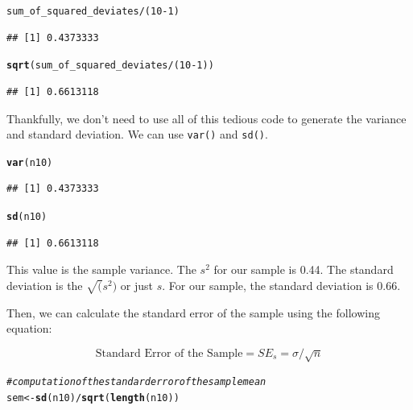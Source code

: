 \documentclass{tufte-handout}\usepackage[]{graphicx}\usepackage[]{color}
\makeatletter
\newcommand{\hlnum}[1]{\textcolor[rgb]{0.686,0.059,0.569}{#1}}%
\newcommand{\hlcom}[1]{\textcolor[rgb]{0.678,0.584,0.686}{\textit{#1}}}%
\newcommand{\hlopt}[1]{\textcolor[rgb]{0,0,0}{#1}}%
\newcommand{\hlstd}[1]{\textcolor[rgb]{0.345,0.345,0.345}{#1}}%
\newcommand{\hlkwb}[1]{\textcolor[rgb]{0.69,0.353,0.396}{#1}}%
\newcommand{\hlkwd}[1]{\textcolor[rgb]{0.737,0.353,0.396}{\textbf{#1}}}%
\newenvironment{kframe}{%
 \def\at@end@of@kframe{}%
 \ifinner\ifhmode%
  \def\at@end@of@kframe{\end{minipage}}%
  \begin{minipage}{\columnwidth}%
 \fi\fi%
 \def\FrameCommand##1{\hskip\@totalleftmargin \hskip-\fboxsep
 \colorbox{shadecolor}{##1}\hskip-\fboxsep
     \hskip-\linewidth \hskip-\@totalleftmargin \hskip\columnwidth}%
 \MakeFramed {\advance\hsize-\width
   \@totalleftmargin\z@ \linewidth\hsize
   \@setminipage}}%
 {\par\unskip\endMakeFramed%
 \at@end@of@kframe}
\newenvironment{knitrout}{}{} %
\makeatother
\begin{document}
\begin{knitrout}
\color{fgcolor}\begin{kframe}
\begin{alltt}
\hlstd{sum_of_squared_deviates}\hlopt{/}\hlstd{(}\hlnum{10}\hlopt{-}\hlnum{1}\hlstd{)}
\end{alltt}
\begin{verbatim}
## [1] 0.4373333
\end{verbatim}
\begin{alltt}
\hlkwd{sqrt}\hlstd{(sum_of_squared_deviates}\hlopt{/}\hlstd{(}\hlnum{10}\hlopt{-}\hlnum{1}\hlstd{))}
\end{alltt}
\begin{verbatim}
## [1] 0.6613118
\end{verbatim}
\end{kframe}
\end{knitrout}
\noindent Thankfully, we don't need to use all of this tedious code to generate the variance and standard deviation. We can use \texttt{var()} and \texttt{sd()}. 
\begin{knitrout}
\color{fgcolor}\begin{kframe}
\begin{alltt}
\hlkwd{var}\hlstd{(n10)}
\end{alltt}
\begin{verbatim}
## [1] 0.4373333
\end{verbatim}
\begin{alltt}
\hlkwd{sd}\hlstd{(n10)}
\end{alltt}
\begin{verbatim}
## [1] 0.6613118
\end{verbatim}
\end{kframe}
\end{knitrout}

\noindent This value is the sample variance. 
The $s^2$ for our sample is 0.44. The standard deviation is the $\sqrt(s^2)$ or just $s$. For our sample, the standard deviation is 0.66. 

Then, we can calculate the standard error of the sample using the following equation: 

\begin{equation}
\textrm{Standard Error of the Sample} = SE_s = \sigma/\sqrt{n}
\end{equation}


\begin{knitrout}
\color{fgcolor}\begin{kframe}
\begin{alltt}
\hlcom{#computation of the standard error of the sample mean}
\hlstd{sem}\hlkwb{<-}\hlkwd{sd}\hlstd{(n10)}\hlopt{/}\hlkwd{sqrt}\hlstd{(}\hlkwd{length}\hlstd{(n10))}
\end{alltt}
\end{kframe}
\end{knitrout}
\end{document}

